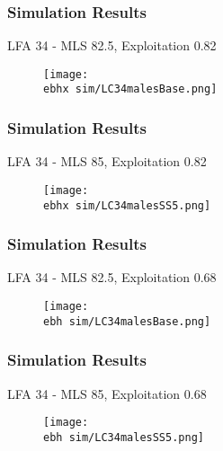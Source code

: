 \documentclass{beamer}
\newcommand{\ebh}{\string~/bio.data/bio.lobster/figures/LFA3438Framework2019/} %
\newcommand{\ebhx}{\string~/bio.data/bio.lobster/figures/LFA3438Framework2019/figures/Brad/} %
\begin{document}
\begin{frame}
\frametitle{Simulation Results}
LFA 34 - MLS 82.5, Exploitation 0.82
\begin{figure}
        \begin{center}
            \texttt{[image: \\ebhx sim/LC34malesBase.png]}
        \end{center}
    \end{figure}
\end{frame}



\begin{frame}
\frametitle{Simulation Results}
LFA 34 - MLS 85, Exploitation 0.82
\begin{figure}
        \begin{center}
            \texttt{[image: \\ebhx sim/LC34malesSS5.png]}
        \end{center}
    \end{figure}
\end{frame}



\begin{frame}
\frametitle{Simulation Results}
LFA 34 - MLS 82.5, Exploitation 0.68
\begin{figure}
        \begin{center}
            \texttt{[image: \\ebh sim/LC34malesBase.png]}
        \end{center}
    \end{figure}
\end{frame}



\begin{frame}
\frametitle{Simulation Results}
LFA 34 - MLS 85, Exploitation 0.68
\begin{figure}
        \begin{center}
            \texttt{[image: \\ebh sim/LC34malesSS5.png]}
        \end{center}
    \end{figure}
\end{frame}





\end{document}
